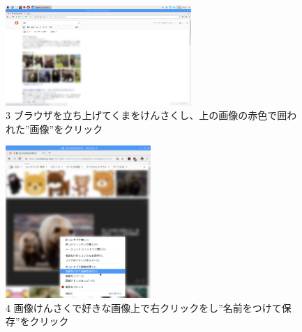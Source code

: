 \documentclass[a4paper,12pt]{jarticle}
\begin{document}
\begin{figure}[t]
  \begin{minipage}{\textwidth}
    \begin{minipage}{7.033cm}
      \includegraphics[width=7.049cm]{textbook-img096.png}\\
      3 ブラウザを立ち上げてくまをけんさくし、上の画像の赤色で囲われた”画像”をクリック
    \end{minipage}
    \begin{minipage}{3.582cm}
    \end{minipage}
    \begin{minipage}{6.582cm}
      \includegraphics[width=5.5cm]{textbook-img095.png}\\
      4 画像けんさくで好きな画像上で右クリックをし”名前をつけて保存”をクリック
    \end{minipage}
  \end{minipage}


\end{figure}
\end{document}
